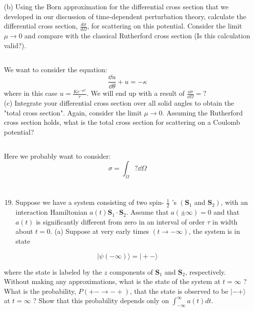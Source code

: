 \documentclass[12pt]{article}
\begin{document}
(b) Using the Born approximation for the differential cross section that we developed in our discussion of time-dependent perturbation theory, calculate the differential cross section, $\frac{d \sigma}{d \Omega}$, for scattering on this potential. Consider the limit $\mu \rightarrow 0$ and compare with the classical Rutherford cross section (Is this calculation valid?).
\subsection{}
We want to consider the equation:
\begin{equation}
  \frac{\dd{ u}}{\dd{\theta }} +u = - \kappa 
\end{equation}
where in this case $u= \frac{Ke^{-\mu r }}{r}$. We will end up with a result of $\frac{\dd{\sigma }}{\dd{\Omega }}=?$\\
(c) Integrate your differential cross section over all solid angles to obtain the "total cross section". Again, consider the limit $\mu \rightarrow 0$. Assuming the Rutherford cross section holds, what is the total cross section for scattering on a Coulomb potential?
\subsection{}
Here we probably want to consider:
\begin{equation}
  \sigma = \int_{\Omega }? \dd{\Omega } 
\end{equation}
\section{}
\begin{enumerate}
  \setcounter{enumi}{18}
  \item Suppose we have a system consisting of two spin- $\frac{1}{2}$ 's $\left(\mathbf{S}_{1}\right.$ and $\left.\mathbf{S}_{2}\right)$, with an interaction Hamiltonian $a(t) \mathbf{S}_{1} \cdot \mathbf{S}_{2}$. Assume that $a( \pm \infty)=0$ and that $a(t)$ is significantly different from zero in an interval of order $\tau$ in width about $t=0$.
(a) Suppose at very early times $(t \rightarrow-\infty)$, the system is in state
\end{enumerate}

$$
|\psi(-\infty)\rangle=|+-\rangle
$$

where the state is labeled by the $z$ components of $\mathbf{S}_{1}$ and $\mathbf{S}_{2}$, respectively. Without making any approximations, what is the state of the system at $t=\infty$ ? What is the probability, $P(+-\rightarrow-+)$, that the state is observed to be $|-+\rangle$ at $t=\infty$ ? Show that this probability depends only on $\int_{-\infty}^{\infty} a(t) d t$.
\end{document}
